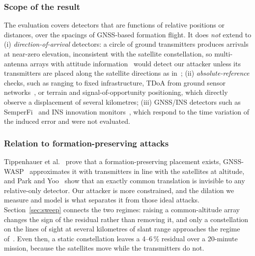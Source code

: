 \documentclass[conference]{IEEEtran}
\begin{document}
\subsubsection*{Scope of the result}
The evaluation covers detectors that are functions of relative
positions or distances, over the spacings of GNSS-based formation
flight. It does \emph{not} extend to (i) \emph{direction-of-arrival}
detectors: a circle of ground transmitters produces arrivals at
near-zero elevation, inconsistent with the satellite constellation, so
multi-antenna arrays with attitude
information~\cite{psiaki2016gnss,borio2016sumofsquares} would detect our
attacker unless its transmitters are placed along the satellite
directions as in~\cite{tibaldo2025gnsswasp}; (ii)
\emph{absolute-reference} checks, such as ranging to fixed
infrastructure, TDoA from ground sensor
networks~\cite{jansen2018crowdgpssec}, or terrain and
signal-of-opportunity positioning, which directly observe a displacement
of several kilometres; (iii) GNSS/INS detectors such as
SemperFi~\cite{sathaye2022semperfi} and INS innovation
monitors~\cite{tanil2018insmonitor,kujur2024insmonitor}, which respond to
the time variation of the induced error and were not evaluated.

\subsubsection*{Relation to formation-preserving attacks}
Tippenhauer et al.~\cite{tippenhauer2011requirements} prove that a
formation-preserving placement exists,
GNSS-WASP~\cite{tibaldo2025gnsswasp} approximates it with transmitters
in line with the satellites at altitude, and Park and
Yoo~\cite{park2026rigidshift} show that an exactly common translation is
invisible to any relative-only detector. Our attacker is more
constrained, and the dilation we measure and model is what separates it
from those ideal attacks. Section~\ref{sec:sweep} connects the two
regimes: raising a common-altitude array changes the sign of the
residual rather than removing it, and only a constellation on the lines
of sight at several kilometres of slant range approaches the regime
of~\cite{tibaldo2025gnsswasp}. Even then, a static constellation leaves
a 4--6\,\% residual over a 20-minute mission, because the satellites
move while the transmitters do not.
\end{document}
